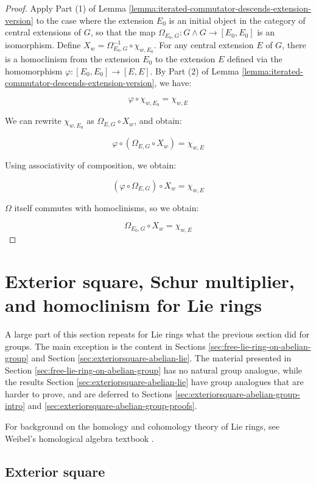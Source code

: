 \begin{proof}
  Apply Part (1) of Lemma
  \ref{lemma:iterated-commutator-descends-extension-version} to the
  case where the extension $E_0$ is an initial object in the category
  of central extensions of $G$, so that the map $\Omega_{E_0,G}: G
  \wedge G \to [E_0,E_0]$ is an isomorphism. Define $X_w =
  \Omega_{E_0,G}^{-1} \circ \chi_{w,E_0}$. For any central extension
  $E$ of $G$, there is a homoclinism from the extension $E_0$ to the
  extension $E$ defined via the homomorphism $\varphi: [E_0,E_0] \to
  [E,E]$. By Part (2) of Lemma
  \ref{lemma:iterated-commutator-descends-extension-version}, we have:

  $$\varphi \circ \chi_{w,E_0} = \chi_{w,E}$$

  We can rewrite $\chi_{w,E_0}$ as $\Omega_{E,G} \circ X_w$, and obtain:

  $$\varphi \circ (\Omega_{E,G} \circ X_w) = \chi_{w,E}$$

  Using associativity of composition, we obtain:

  $$(\varphi \circ \Omega_{E,G}) \circ X_w = \chi_{w,E}$$

  $\Omega$ itself commutes with homoclinisms, so we obtain:

  $$\Omega_{E_0,G} \circ X_w = \chi_{w,E}$$
\end{proof}

\section{Exterior square, Schur multiplier, and homoclinism for Lie rings}\label{sec:exteriorsquare-and-homoclinism-lie}

A large part of this section repeats for Lie rings what the previous
section did for groups. The main exception is the content in Sections
\ref{sec:free-lie-ring-on-abelian-group} and Section
\ref{sec:exteriorsquare-abelian-lie}. The material presented in
Section \ref{sec:free-lie-ring-on-abelian-group} has no natural group
analogue, while the results Section
\ref{sec:exteriorsquare-abelian-lie} have group analogues that are
harder to prove, and are deferred to Sections
\ref{sec:exteriorsquare-abelian-group-intro} and
\ref{sec:exteriorsquare-abelian-group-proofs}.

For background on the homology and cohomology theory of Lie rings, see
Weibel's homological algebra textbook \cite{Weibel}.

\subsection{Exterior square}\label{sec:exteriorsquare-lie}

